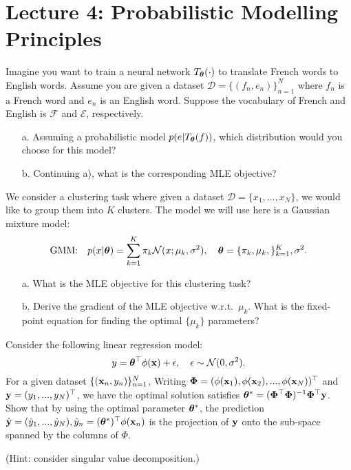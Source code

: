 \section{Lecture 4: Probabilistic Modelling Principles}

\begin{question}
\label{q:translation}
Imagine you want to train a neural network $T_{\bm{\theta}}(\cdot)$ to translate French words to English words. Assume you are given a dataset $\mathcal{D} = \{(f_n, e_n) \}_{n=1}^N$ where $f_n$ is a French word and $e_n$ is an English word. Suppose the vocabulary of French and English is $\mathcal{F}$ and $\mathcal{E}$, respectively.
%
\begin{itemize}
    \item[a.] Assuming a probabilistic model $p(e | T_{\bm{\theta}}(f))$, which distribution would you choose for this model?
    \item[b.] Continuing a), what is the corresponding MLE objective? 
\end{itemize}
%
\end{question}

\begin{question}[Clustering]
\label{q:clustering_gmm}
We consider a clustering task where given a dataset $\mathcal{D} = \{x_1, ...,x_N \}$, we would like to group them into $K$ clusters. The model we will use here is a Gaussian mixture model:
$$\text{GMM:} \quad p(x | \bm{\theta}) = \sum_{k=1}^K \pi_k \mathcal{N}(x; \mu_k, \sigma^2), \quad \bm{\theta} = \{ \pi_k, \mu_k, \}_{k=1}^K, \sigma^2.$$
%
\begin{itemize}
    \item[a.] What is the MLE objective for this clustering task?
    \item[b.] Derive the gradient of the MLE objective w.r.t.~$\mu_k$. What is the fixed-point equation for finding the optimal $\{ \mu_k \}$ parameters?
\end{itemize}

\end{question}


\begin{question}
\label{q:linear_regression_projection}
Consider the following linear regression model:
$$y = \bm{\theta}^\top \phi(\mathbf{x}) + \epsilon, \quad \epsilon \sim \mathcal{N}(0, \sigma^2).$$
For a given dataset $\{ (\mathbf{x}_n, y_n) \}_{n=1}^N$, Writing $\bm{\Phi} = (\phi(\mathbf{x}_1), \phi(\mathbf{x}_2), ..., \phi(\mathbf{x}_N))^\top$ and $\mathbf{y} = (y_1, ..., y_N)^\top$, we have the optimal solution satisfies $\bm{\theta}^* = (\bm{\Phi}^\top \bm{\Phi})^{-1} \bm{\Phi}^\top \mathbf{y}$. Show that by using the optimal parameter $\bm{\theta}^*$, the prediction $\hat{\mathbf{y}} = (\hat{y}_1, ..., \hat{y}_N), \hat{y}_n = (\bm{\theta}^*)^\top \phi(\mathbf{x}_n)$ is the projection of $\mathbf{y}$ onto the sub-space spanned by the columns of $\Phi$.

(Hint: consider singular value decomposition.)

\end{question}